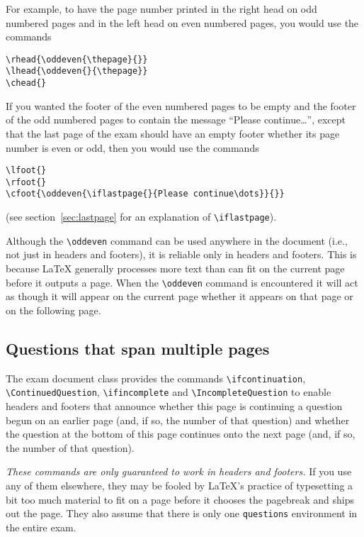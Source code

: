 \documentclass[12pt]{exam}
\begin{document}
For example, to have the page number printed in the right head on odd
numbered pages and in the left head on even numbered pages, you would
use the commands
\begin{center}
\begin{verbatim}
\rhead{\oddeven{\thepage}{}}
\lhead{\oddeven{}{\thepage}}
\chead{}
\end{verbatim}
\end{center}
If you wanted the footer of the even numbered pages to be empty and
the footer of the odd numbered pages to contain the message ``Please
continue\dots'', except that the last page of the exam should have an empty
footer whether its page number is even or odd, then you would use the
commands 
\begin{center}
\begin{verbatim}
\lfoot{}
\rfoot{}
\cfoot{\oddeven{\iflastpage{}{Please continue\dots}}{}}
\end{verbatim}
\end{center}
(see section~\ref{sec:lastpage} for an explanation of
\verb"\iflastpage"). 

Although the \verb"\oddeven" command can be used anywhere in the
document (i.e., not just in headers and footers), it is reliable only
in headers and footers.  This is because \LaTeX{} generally processes
more text than can fit on the current page before it outputs a page.
When the \verb"\oddeven" command is encountered it will act as though
it will appear on the current page whether it appears on that page or
on the following page.

\subsection{Questions that span multiple pages}
\label{sec:QuesSpan}

The exam document class provides the commands \verb"\ifcontinuation",
\verb"\ContinuedQuestion", \verb"\ifincomplete" and
\verb"\IncompleteQuestion" to enable headers and footers that announce
whether this page is continuing a question begun on an earlier page
(and, if so, the number of that question) and whether the question at
the bottom of this page continues onto the next page (and, if so, the
number of that question).  

\emph{These commands are only guaranteed to work in headers and
  footers.}  If you use any of them elsewhere, they may be fooled by
\LaTeX's practice of typesetting a bit too much material to fit on a
page before it chooses the pagebreak and ships out the page.  They
also assume that there is only one \verb"questions" environment in the
entire exam.
\end{document}
